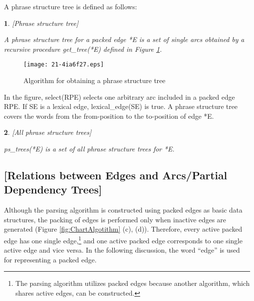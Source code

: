 \documentclass[english]{jnlp_1.4_rep}
\theoremstyle{break}
\theoremstyle{plain}
\theoremstyle{plain}
\newtheorem{definition}{}
\begin{document}
\noindent
A phrase structure tree is defined as follows:

\clearpage
\begin{definition}\label{def:ParseTree}[Phrase structure tree] 

A phrase structure tree for a packed edge *E is a set of single arcs obtained by a recursive procedure get\_tree(*E) defined in Figure \ref{fig:get_parse_tree}.
\end{definition}

\begin{figure}[t]
 \begin{center}
\texttt{[image: 21-4ia6f27.eps]}
 \end{center}
\caption{Algorithm for obtaining a phrase structure tree}
\label{fig:get_parse_tree}
\end{figure}

In the figure, select(RPE) selects one arbitrary arc included in a
packed edge RPE. If SE is a lexical edge, lexical\_edge(SE) is true. A
phrase structure tree covers the words from the from-position to the
to-position of edge *E.

\begin{definition}\label{AllParseTrees}[All phrase structure trees] 

ps\_trees(*E) is a set of all phrase structure trees for *E.
\end{definition}


\subsection*{[Relations between Edges and Arcs/Partial Dependency Trees]}

Although the parsing algorithm is constructed using packed edges as
basic data structures, the packing of edges is performed only when
inactive edges are generated (Figure \ref{fig:ChartAlgotithm}
(c), (d)). Therefore, every active packed edge has one single
edge,\footnote{The parsing algorithm utilizes packed edges because
  another algorithm, which shares active edges, can be constructed.}
and one active packed edge corresponds to one single active edge and
vice versa. In the following discussion, the word ``edge'' is used for
representing a packed edge.
\end{document}
